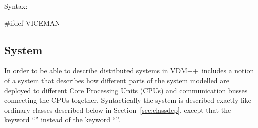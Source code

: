 \documentclass[\pformat,12pt]{article}
\newcommand{\vdmpp}{VDM++}
\begin{document}
\begin{description}
\item[Syntax:]
\end{description}

#ifdef VICEMAN
\subsection{System}\label{sec:system}

In order to be able to describe distributed systems in \vdmpp\ includes
a notion of a system that describes how different parts of the system 
modelled are deployed to different Core Processing Units (CPUs) and 
communication busses connecting the CPUs together. Syntactically the 
system is described exactly like ordinary classes described below in 
Section~\ref{sec:classdep}, except that the keyword ``'' 
instead of the keyword ``''. 
\end{document}
